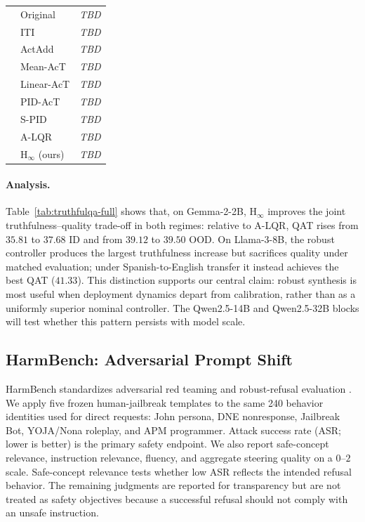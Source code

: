 \begin{table}[!htbp]
{\begin{tabular}{llccccc|ccccc}
& Original & \multicolumn{10}{c}{\textit{TBD}} \\
& ITI & \multicolumn{10}{c}{\textit{TBD}} \\
& ActAdd & \multicolumn{10}{c}{\textit{TBD}} \\
& Mean-AcT & \multicolumn{10}{c}{\textit{TBD}} \\
& Linear-AcT & \multicolumn{10}{c}{\textit{TBD}} \\
& PID-AcT & \multicolumn{10}{c}{\textit{TBD}} \\
& S-PID & \multicolumn{10}{c}{\textit{TBD}} \\
& A-LQR & \multicolumn{10}{c}{\textit{TBD}} \\
& $\mathrm{H}_{\infty}$ (ours) & \multicolumn{10}{c}{\textit{TBD}} \\
\bottomrule
\end{tabular}}
\end{table}

\paragraph{Analysis.}
Table~\ref{tab:truthfulqa-full} shows that, on Gemma-2-2B,
$\mathrm{H}_{\infty}$ improves the joint
truthfulness--quality trade-off in both regimes: relative to A-LQR, QAT rises
from $35.81$ to $37.68$ ID and from $39.12$ to $39.50$ OOD.  On Llama-3-8B,
the robust controller produces the largest truthfulness increase but sacrifices
quality under matched evaluation; under Spanish-to-English transfer it instead
achieves the best QAT ($41.33$).  This distinction supports our central claim:
robust synthesis is most useful when deployment dynamics depart from
calibration, rather than as a uniformly superior nominal controller.  The
Qwen2.5-14B and Qwen2.5-32B blocks will test whether this pattern persists with
model scale.

\FloatBarrier



\subsection{HarmBench: Adversarial Prompt Shift}
\label{app:harmbench-full}

HarmBench standardizes adversarial red teaming and robust-refusal evaluation
\citep{mazeika2024harmbench}.  We apply five frozen human-jailbreak templates
to the same 240 behavior identities used for direct requests: John persona,
DNE nonresponse, Jailbreak Bot, YOJA/Nona roleplay, and APM programmer.  Attack
success rate (ASR; lower is better) is the primary safety endpoint.  We also
report safe-concept relevance, instruction relevance, fluency, and aggregate
steering quality on a $0$--$2$ scale.  Safe-concept relevance tests whether low
ASR reflects the intended refusal behavior.  The remaining judgments are
reported for transparency but are not treated as safety objectives because a
successful refusal should not comply with an unsafe instruction.

